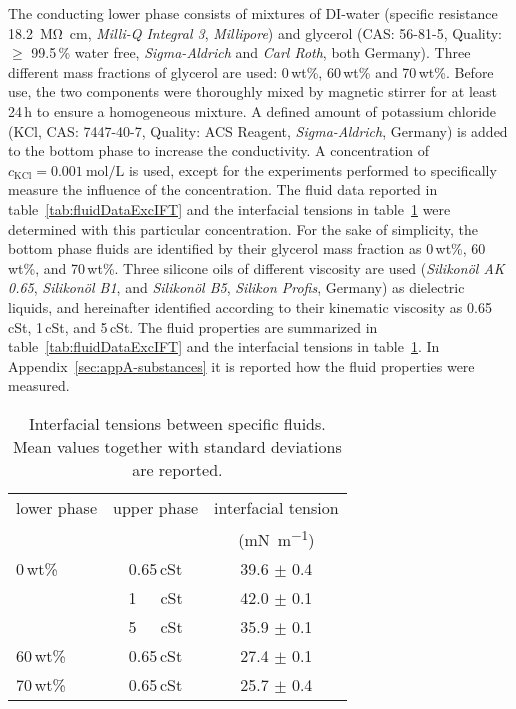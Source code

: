 \documentclass{jfm_arxiv}
\begin{document}
The conducting lower phase consists of mixtures of DI-water (specific resistance \SI{18.2}{\mega\ohm \centi\meter}, \textit{Milli-Q Integral 3}, \textit{Millipore}) and glycerol (CAS: 56-81-5, Quality: $\geq$ 99.5\,\% water free, \textit{Sigma-Aldrich} and \textit{Carl Roth}, both Germany).
Three different mass fractions of glycerol are used: 0\,wt\%, 60\,wt\% and 70\,wt\%.
Before use, the two components were thoroughly mixed by magnetic stirrer for at least 24\,h to ensure a homogeneous mixture.
A defined amount of potassium chloride (KCl, CAS: 7447-40-7, Quality: ACS Reagent, \textit{Sigma-Aldrich}, Germany) is added to the bottom phase to increase the conductivity.
A concentration of $c_\mathrm{KCl} = \SI{0.001}{\mole\per\liter}$ is used, except for the experiments performed to specifically measure the influence of the concentration.
The fluid data reported in table~\ref{tab:fluidDataExcIFT} and the interfacial tensions in table~\ref{tab:IFTs} were determined with this particular concentration.
For the sake of simplicity, the bottom phase fluids are identified by their glycerol mass fraction as 0\,wt\%, 60\,wt\%, and 70\,wt\%.
Three silicone oils of different viscosity are used (\textit{Silikonöl AK 0.65}, \textit{Silikonöl B1}, and \textit{Silikonöl B5}, \textit{Silikon Profis}, Germany) as dielectric liquids, and hereinafter identified according to their kinematic viscosity as 0.65\,cSt, 1\,cSt, and 5\,cSt.
The fluid properties are summarized in table~\ref{tab:fluidDataExcIFT} and the interfacial tensions in table~\ref{tab:IFTs}.
In Appendix~\ref{sec:appA-substances} it is reported how the fluid properties were measured.

  \begin{table}
  \begin{center}    
        \begin{tabular}{l c c}
         lower phase & upper phase & interfacial tension \\
       & & (\si{\milli\newton\per\metre}) \\[3pt]
        0\,wt\% 	& 0.65\,cSt & 39.6 $\pm$ 0.4 \\
                	& 1~~~cSt & 42.0 $\pm$ 0.1 \\
                	& 5~~~cSt & 35.9 $\pm$ 0.1 \\
        60\,wt\% 	& 0.65\,cSt & 27.4 $\pm$ 0.1 \\        
        70\,wt\% 	& 0.65\,cSt & 25.7 $\pm$ 0.4 	
        \end{tabular}
	\caption{Interfacial tensions between specific fluids. Mean values together with standard deviations are reported.}
		\label{tab:IFTs}
  \end{center}
\end{table}
\end{document}
